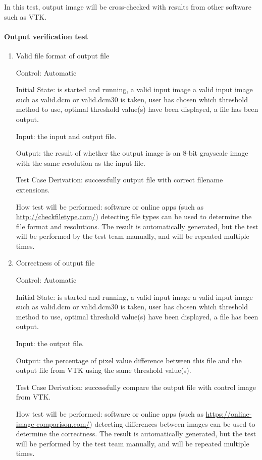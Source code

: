 \documentclass[12pt, titlepage]{article}
\begin{document}
In this test, output image will be cross-checked with results from other
software such as VTK.
		
\paragraph{Output verification test}

\begin{enumerate}

\item{Valid file format of output file}

Control: Automatic
					
Initial State: \progname{} is started and running, a valid input image a valid
input image such as valid.dcm or valid.dcm30 is taken, user has chosen which
threshold method to use, optimal threshold value(s) have been displayed, a file
has been output.
					
Input: the input and output file.
					
Output: the result of whether the output image is an 8-bit grayscale image with
the same resolution as the input file.

Test Case Derivation: successfully output file with correct filename extensions.

How test will be performed: software or online apps (such as
\url{http://checkfiletype.com/}) detecting file types can be used to determine
the file format and resolutions. The result is automatically generated, but the
test will be performed by the test team manually, and will be repeated multiple
times.

\item{Correctness of output file}


Control: Automatic
					
Initial State: \progname{} is started and running, a valid input image a valid
input image such as valid.dcm or valid.dcm30 is taken, user has chosen which
threshold method to use, optimal threshold value(s) have been displayed, a file
has been output.
					
Input: the output file.
					
Output: the percentage of pixel value difference between this file and the
output file from VTK using the same threshold value(s).

Test Case Derivation: successfully compare the output file with control image
from VTK.

How test will be performed: software or online apps (such as
\url{https://online-image-comparison.com/}) detecting differences between images
can be used to determine the correctness. The result is automatically generated,
but the test will be performed by the test team manually, and will be repeated
multiple times.

\end{enumerate}
\end{document}
